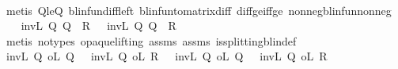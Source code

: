\begin{isabellebody}
\ \ \ \ \isamarkupfalse%
\ {\isacharparenleft}{\kern0pt}metis\ Q{}{\isacharunderscore}{\kern0pt}le{\isacharunderscore}{\kern0pt}Q{}\ blinfun{\isachardot}{\kern0pt}diff{\isacharunderscore}{\kern0pt}left\ blinfun{\isacharunderscore}{\kern0pt}to{\isacharunderscore}{\kern0pt}matrix{\isacharunderscore}{\kern0pt}diff\ diff{\isacharunderscore}{\kern0pt}ge{\isacharunderscore}{\kern0pt}{}{\isacharunderscore}{\kern0pt}iff{\isacharunderscore}{\kern0pt}ge\ nonneg{\isacharunderscore}{\kern0pt}blinfun{\isacharunderscore}{\kern0pt}nonneg{\isacharparenright}{\kern0pt}\isanewline
\ \ \isamarkupfalse%
\ {\isachardoublequoteopen}{\isacharparenleft}{\kern0pt}inv\isactrlsub L\ Q{}{\isacharparenright}{\kern0pt}\ {\isacharparenleft}{\kern0pt}{\isacharparenleft}{\kern0pt}Q{}\ {\isacharminus}{\kern0pt}\ R{}{\isacharparenright}{\kern0pt}\ {}{\isacharparenright}{\kern0pt}\ {\isasymle}\ {\isacharparenleft}{\kern0pt}inv\isactrlsub L\ Q{}{\isacharparenright}{\kern0pt}\ {\isacharparenleft}{\kern0pt}{\isacharparenleft}{\kern0pt}Q{}\ {\isacharminus}{\kern0pt}\ R{}{\isacharparenright}{\kern0pt}\ {}{\isacharparenright}{\kern0pt}{\isachardoublequoteclose}\isanewline
\ \ \ \ \isamarkupfalse%
\ {\isacharparenleft}{\kern0pt}metis\ {\isacharparenleft}{\kern0pt}no{\isacharunderscore}{\kern0pt}types{\isacharcomma}{\kern0pt}\ opaque{\isacharunderscore}{\kern0pt}lifting{\isacharparenright}{\kern0pt}\ assms{\isacharparenleft}{\kern0pt}{}{\isacharparenright}{\kern0pt}\ assms{\isacharparenleft}{\kern0pt}{}{\isacharparenright}{\kern0pt}\ is{\isacharunderscore}{\kern0pt}splitting{\isacharunderscore}{\kern0pt}blin{\isacharunderscore}{\kern0pt}def{\isacharprime}{\kern0pt}{\isacharparenright}{\kern0pt}\isanewline
\ \ \isamarkupfalse%
\ {\isachardoublequoteopen}{\isacharparenleft}{\kern0pt}inv\isactrlsub L\ Q{}\ o\isactrlsub L\ Q{}{\isacharparenright}{\kern0pt}\ {}\ {\isacharminus}{\kern0pt}\ {\isacharparenleft}{\kern0pt}inv\isactrlsub L\ Q{}\ o\isactrlsub L\ R{}{\isacharparenright}{\kern0pt}\ {}\ {\isasymle}\ {\isacharparenleft}{\kern0pt}inv\isactrlsub L\ Q{}\ o\isactrlsub L\ Q{}{\isacharparenright}{\kern0pt}\ {}\ {\isacharminus}{\kern0pt}\ {\isacharparenleft}{\kern0pt}inv\isactrlsub L\ Q{}\ o\isactrlsub L\ R{}{\isacharparenright}{\kern0pt}\ {}{\isachardoublequoteclose}\isanewline

\end{isabellebody}
